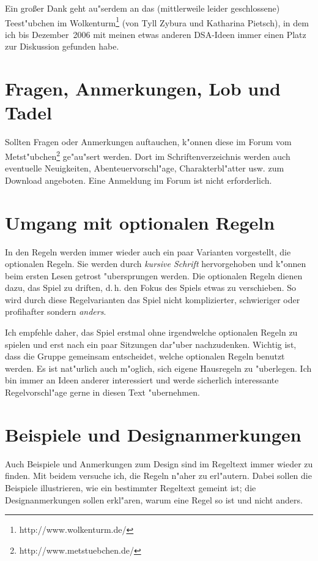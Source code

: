 Ein großer Dank geht au"serdem an das (mittlerweile leider geschlossene) Teest"ubchen im Wolkenturm\footnote{http://www.wolkenturm.de/} (von Tyll Zybura und Katharina Pietsch), in dem ich bis Dezember~2006 mit meinen etwas anderen DSA-Ideen immer einen Platz zur Diskussion gefunden habe.

\section{Fragen, Anmerkungen, Lob und Tadel}
Sollten Fragen oder Anmerkungen auftauchen, k"onnen diese im Forum vom Metst"ubchen\footnote{http://www.metstuebchen.de/} ge"au"sert werden. Dort im Schriftenverzeichnis werden auch eventuelle Neuigkeiten, Abenteuervorschl"age, Charakterbl"atter usw. zum Download angeboten. Eine Anmeldung im Forum ist nicht erforderlich.

\section{Umgang mit optionalen Regeln}
In den Regeln werden immer wieder auch ein paar Varianten vorgestellt, die optionalen Regeln. Sie werden durch \emph{kursive Schrift} hervorgehoben und k"onnen beim ersten Lesen getrost "ubersprungen werden. Die optionalen Regeln dienen dazu, das Spiel zu driften, d.\,h. den Fokus des Spiels etwas zu verschieben. So wird durch diese Regelvarianten das Spiel nicht komplizierter, schwieriger oder profihafter sondern \emph{anders}.

Ich empfehle daher, das Spiel erstmal ohne irgendwelche optionalen Regeln zu spielen und erst nach ein paar Sitzungen dar"uber nachzudenken. Wichtig ist, dass die Gruppe gemeinsam entscheidet, welche optionalen Regeln benutzt werden. Es ist nat"urlich auch m"oglich, sich eigene Hausregeln zu "uberlegen. Ich bin immer an Ideen anderer interessiert und werde sicherlich interessante Regelvorschl"age gerne in diesen Text "ubernehmen.

\section{Beispiele und Designanmerkungen}
Auch Beispiele und Anmerkungen zum Design sind im Regeltext immer wieder zu finden. Mit beidem versuche ich, die Regeln n"aher zu erl"autern. Dabei sollen die Beispiele illustrieren, wie ein bestimmter Regeltext gemeint ist; die Designanmerkungen sollen erkl"aren, warum eine Regel so ist und nicht anders.

